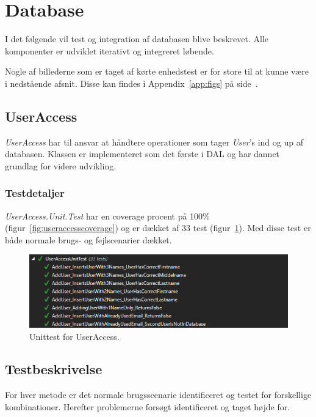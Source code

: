 \section{Database}\label{sec:testdatabase}
I det følgende vil test og integration af databasen blive beskrevet. Alle komponenter er udviklet iterativt og integreret løbende.

Nogle af billederne som er taget af kørte enhedstest er for store til at kunne være i nedstående afsnit. Disse kan findes i Appendix~\ref{app:figs} på side~\pageref{app:figs}.

\subsection{UserAccess}
\textit{UserAccess} har til ansvar at håndtere operationer som tager \textit{User}'s ind og up af databasen. Klassen er implementeret som det første i DAL og har dannet grundlag for videre udvikling.

\subsubsection{Testdetaljer}
\textit{UserAccess.Unit.Test} har en coverage procent på 100\% (figur~\ref{fig:useraccesscoverage}) og er dækket af 33 test (figur~\ref{fig:useraccessunittest}). Med disse test er både normale brugs- og fejlscenarier dækket.

\begin{figure}[h]
\centering
\includegraphics[width=0.9\linewidth]{figs/test/useraccessunittest}
\caption{Unittest for UserAccess.}
\label{fig:useraccessunittest}
\end{figure}

\subsection{Testbeskrivelse}
For hver metode er det normale brugsscenarie identificeret og testet for forskellige kombinationer. Herefter problemerne forsøgt identificeret og taget højde for.
 
